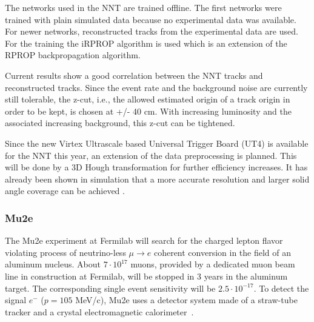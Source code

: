 The networks used in the NNT are trained offline. The first networks were trained with plain simulated data because no experimental data was available. For newer networks, reconstructed tracks from the experimental data are used. For the training the iRPROP algorithm is used which is an extension of the RPROP backpropagation algorithm.

Current results show a good correlation between the NNT tracks and reconstructed tracks. Since the event rate and the background noise are currently still tolerable, the z-cut, i.e., the allowed estimated origin of a track origin in order to be kept, is chosen at +/- 40 cm. With increasing luminosity and the associated increasing background, this z-cut can be tightened.

Since the new Virtex Ultrascale based Universal Trigger Board (UT4) is available for the NNT this year, an extension of the data preprocessing is planned. This will be done by a 3D Hough transformation for further efficiency increases. It has already been shown in simulation that a more accurate resolution and larger solid angle coverage can be achieved \cite{Skambraks_2020}.

\subsubsection{Mu2e}
The Mu2e experiment at Fermilab will search for the charged lepton flavor violating process of neutrino-less $\mu \to e$ coherent conversion in the field of an aluminum nucleus. About $7\cdot 10^{17}$ muons, provided by a dedicated muon beam line in construction at Fermilab, will be stopped in 3 years in the aluminum target. The corresponding single event sensitivity will be $2.5\cdot 10^{-17}$. To detect the signal $e^-$ ($p=105$ MeV/c), Mu2e uses a detector system made of a straw-tube tracker and a crystal electromagnetic calorimeter~\cite{MU2E}. 

